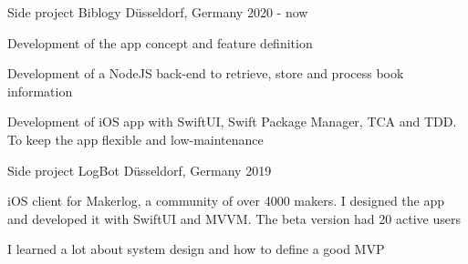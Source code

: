 

\begin{cventries}

  \cventry
    {Side project} %
    {Biblogy} %
    {Düsseldorf, Germany} %
    {2020 - now} %
    {
      \begin{cvitems} %
      	\item {Development of the app concept and feature definition}
      	\item {Development of a NodeJS back-end to retrieve, store and process book information}
      	\item {Development of iOS app with SwiftUI, Swift Package Manager, TCA and TDD. To keep the app flexible and low-maintenance}
      \end{cvitems}
    }

  \cventry
    {Side project} %
    {LogBot} %
    {Düsseldorf, Germany} %
    {2019} %
    {
      \begin{cvitems} %
        \item {iOS client for Makerlog, a community of over 4000 makers. I designed the app and developed it with SwiftUI and MVVM. The beta version had 20 active users}
		\item {I learned a lot about system design and how to define a good MVP}
      \end{cvitems}
    }
	

\end{cventries}
